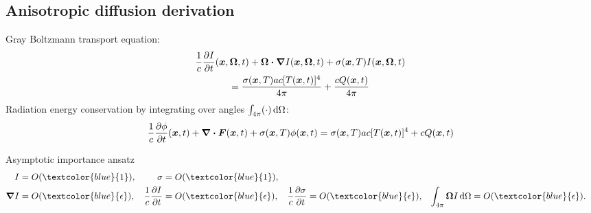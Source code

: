 \documentclass{beamer}
\newcommand{\epsiloncolor}[1]{\textcolor{blue}{#1}}
\begin{document}
\subsection{Anisotropic diffusion derivation}
\begin{frame}
  Gray Boltzmann transport equation:
  \begin{multline} \label{eq:fullGrayTransport2}
  \frac{1}{c} \frac{\partial I}{\partial t}(\bm{x}, \bm{\Omega}, t)
  + \bm{\Omega} \bm{\cdot} \bm{\nabla} I(\bm{x}, \bm{\Omega}, t) +
 \sigma(\bm{x}, T) I(\bm{x}, \bm{\Omega}, t)
  \\= \frac{\sigma(\bm{x}, T) a c [T(\bm{x},t)]^4}{4\pi} 
  + \frac{c Q(\bm{x},t)}{4\pi}
  \end{multline}
  Radiation energy conservation by integrating over angles $\int_{4\pi} (\cdot) \mathop{}\!\mathrm{d}
  \Omega$:
  \begin{equation} \label{eq:grayTransportZeroth}
  \frac{1}{c} \frac{\partial \phi}{\partial t}(\bm{x}, t)
  +\bm{\nabla} \bm{\cdot} \bm{F}(\bm{x}, t) +
 \sigma(\bm{x}, T) \phi(\bm{x}, t)
  = \sigma(\bm{x}, T) a c [T(\bm{x},t)]^4
  + c Q(\bm{x},t)
  \end{equation}

  \begin{block}{Asymptotic importance ansatz}
    \begin{align*}
  I &= O(\epsiloncolor{1}), &
  \sigma &= O(\epsiloncolor{1}), \\
  \del I &= O(\epsiloncolor{\epsilon}), &
  \frac1c\pder{I}{t} &= O(\epsiloncolor{\epsilon}), &
  \frac1c\pder{\sigma}{t} &= O(\epsiloncolor{\epsilon}), &
  \int_{4\pi} \vec{\Omega} I\ud \Omega &= O(\epsiloncolor{\epsilon}).
    \end{align*}
  \end{block}
\end{frame}
\end{document}
